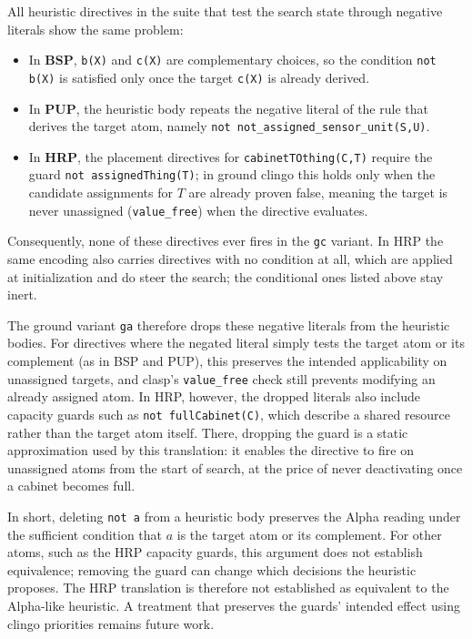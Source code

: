 All heuristic directives in the suite that test the search state through negative literals show the same problem:
\begin{itemize}
    \item In \textbf{BSP}, \texttt{b(X)} and \texttt{c(X)} are complementary choices, so the condition \texttt{not b(X)} is satisfied only once the target \texttt{c(X)} is already derived.
    \item In \textbf{PUP}, the heuristic body repeats the negative literal of the rule that derives the target atom, namely \texttt{not not\_assigned\_sensor\_unit(S,U)}.
    \item In \textbf{HRP}, the placement directives for \texttt{cabinetTOthing(C,T)} require the guard \texttt{not assignedThing(T)}; in ground clingo this holds only when the candidate assignments for $T$ are already proven false, meaning the target is never unassigned (\texttt{value\_free}) when the directive evaluates.
\end{itemize}
Consequently, none of these directives ever fires in the \texttt{gc} variant. In HRP the same encoding also carries directives with no condition at all, which are applied at initialization and do steer the search; the conditional ones listed above stay inert.

The ground variant \texttt{ga} therefore drops these negative literals from the heuristic bodies. 
For directives where the negated literal simply tests the target atom or its complement (as in BSP and PUP), this preserves the intended applicability on unassigned targets, and clasp's \texttt{value\_free} check still prevents modifying an already assigned atom. 
In HRP, however, the dropped literals also include capacity guards such as \texttt{not fullCabinet(C)}, which describe a shared resource rather than the target atom itself. There, dropping the guard is a static approximation used by this translation: it enables the directive to fire on unassigned atoms from the start of search, at the price of never deactivating once a cabinet becomes full.

In short, deleting \texttt{not a} from a heuristic body preserves the Alpha reading under the sufficient condition that $a$ is the target atom or its complement. For other atoms, such as the HRP capacity guards, this argument does not establish equivalence; removing the guard can change which decisions the heuristic proposes. The HRP translation is therefore not established as equivalent to the Alpha-like heuristic. A treatment that preserves the guards' intended effect using clingo priorities remains future work.


